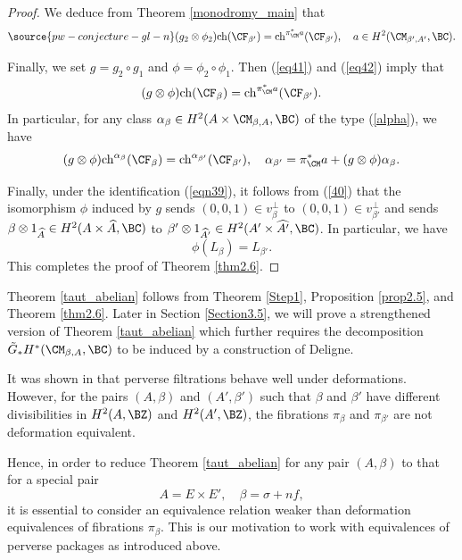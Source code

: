 \begin{proof}
We deduce from Theorem \ref{monodromy_main} that
\begin{equation}\label{eq42}
\source{pw-conjecture-gl-n}
(g_2 \otimes \phi_2) \mathrm{ch}(\CF_{\beta'}) =  \mathrm{ch}^{\pi_\CM^*a}(\CF_{\beta'}), \quad a \in H^2(\CM_{\beta',A'}, \BC).
\end{equation}

Finally, we set $g = g_2 \circ g_1$ and $\phi = \phi_2\circ \phi_1$.
Then  (\ref{eq41}) and (\ref{eq42}) imply that
\[
(g\otimes \phi)\mathrm{ch}(\CF_{\beta}) = \mathrm{ch}^{\pi_\CM^*a}(\CF_{\beta'}).
\]
In particular, for any class $\alpha_\beta \in H^2(A\times \CM_{\beta,A}, \BC)$ of the type (\ref{alpha}), we have
\[
(g\otimes \phi)\mathrm{ch}^{\alpha_\beta}(\CF_{\beta}) = \mathrm{ch}^{\alpha_{\beta'}}(\CF_{\beta'}), \quad \alpha_{\beta'} = \pi_\CM^*a+ (g\otimes \phi)\alpha_\beta.
\]

Finally, under the identification (\ref{eqn39}), it follows from (\ref{40}) that the isomorphism $\phi$ induced by $g$ sends $(0,0,1) \in v_\beta^\perp$ to $(0,0,1) \in v_{\beta'}^\perp$ and sends $\beta\otimes 1_{\widehat{A}} \in H^2(A\times \widehat{A}, \BC)$ to $\beta' \otimes 1_{\widehat{A'}} \in H^2(A'\times \widehat{A'}, \BC)$. In particular, we have
\[
\phi(L_\beta) = L_{\beta'}.
\]
This completes the proof of Theorem \ref{thm2.6}.
\end{proof}

Theorem \ref{taut_abelian} follows from Theorem \ref{Step1}, Proposition \ref{prop2.5}, and Theorem \ref{thm2.6}. Later in Section \ref{Section3.5}, we will prove a strengthened version of Theorem \ref{taut_abelian} which further requires the decomposition $\tilde{G}_*H^*(\CM_{\beta,A}, \BC)$ to be induced by a construction of Deligne.

\begin{rmk}
\notready\label{remark2.8}
It was shown in \cite{dCM} that perverse filtrations behave well under deformations. However, for the pairs $(A, \beta)$ and $(A',\beta')$ such that $\beta$ and $\beta'$ have different divisibilities in $H^2(A, \BZ)$ and $H^2(A',\BZ)$, the fibrations $\pi_\beta$ and $\pi_{\beta'}$ are not deformation equivalent.

Hence, in order to reduce Theorem \ref{taut_abelian} for any pair $(A,\beta)$ to that for a special pair
\[
A= E \times E', \quad \beta = \sigma +n f,
\]
it is essential to consider an equivalence relation weaker than deformation equivalences of fibrations $\pi_\beta$. This is our motivation to work with equivalences of perverse packages as introduced above.
\end{rmk}
